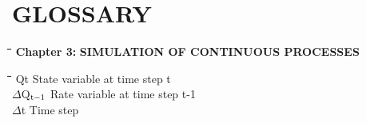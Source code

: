 \documentclass[11pt]{article}
\begin{document}
\setcounter{page}{175}\pagenumpos{\pnbr}
\section{  GLOSSARY  }

\bigskip
\nwln
\begin{tabbing}
\hspace{1.27cm}\=\hspace{1.27cm}\=\hspace{1.27cm}\=\hspace{1.27cm}\=%
\hspace{1.27cm}\=\hspace{1.27cm}\=\hspace{1.27cm}\=\hspace{1.27cm}\=%
\hspace{1.27cm}\=\hspace{1.27cm}\=\kill
{\bf {\large Chapter 3:}}\> \> \> {\bf {\large SIMULATION OF CONTINUOUS PROCESSES}}
\end{tabbing}
\nwln
\begin{tabbing}
\hspace{1.27cm}\=\hspace{1.27cm}\=\hspace{1.27cm}\=\hspace{1.27cm}\=%
\hspace{1.27cm}\=\hspace{1.27cm}\=\hspace{1.27cm}\=\hspace{1.27cm}\=%
\hspace{1.27cm}\=\hspace{1.27cm}\=\kill
Qt\> \> State variable at time step t\> \> \> \> \> \> \> \> [unit]\\
$\Delta$Q$_{{\rm t-1}}$\> \> Rate variable at time step t-1\> \> \> \> \> \> \> \>  [unit d$^{{\rm -1}}$]\\
$\Delta$t\> \> Time step\> \> \> \> \> \> \> \> [d]
\end{tabbing}
\end{document}
